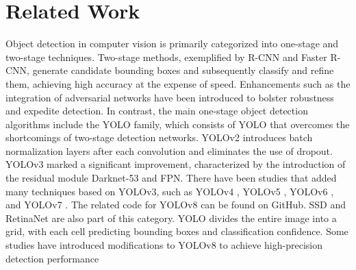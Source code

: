 \section{Related Work}
\label{sec2}


Object detection in computer vision is primarily categorized into one-stage and two-stage techniques. Two-stage methods, exemplified by R-CNN\cite{Rich Feature Hierarchies for Accurate Object Detection and Semantic Segmentation} and Faster R-CNN\cite{Faster R-CNN: Towards Real-Time Object Detection with Region Proposal Networks}, generate candidate bounding boxes and subsequently classify and refine them, achieving high accuracy at the expense of speed. Enhancements such as the integration of adversarial networks have been introduced to bolster robustness and expedite detection. In contrast, the main one-stage object detection algorithms include the YOLO family, which consists of YOLO \cite{redomnYOLO2016} that overcomes the shortcomings of two-stage detection networks. YOLOv2 \cite{YOLO9000} introduces batch normalization layers after each convolution and eliminates the use of dropout. YOLOv3 \cite{YOLOv3: An Incremental Improvement} marked a significant improvement, characterized by the introduction of the residual module Darknet-53 and FPN. There have been studies that added many techniques based on YOLOv3, such as YOLOv4 \cite{Yolov4: Optimal speed and accuracy of object detection}, YOLOv5 \cite{YOLOv5 by Ultralytics}, YOLOv6 \cite{YOLOv6: A Single-Stage Object Detection Framework for Industrial Applications 2022}, and YOLOv7 \cite{YOLOv7: Trainable Bag-of-Freebies Sets New State-of-the-Art for Real-Time Object Detectors}. The related code for YOLOv8 can be found on GitHub. SSD \cite{SSD: Single Shot MultiBox Detector} and RetinaNet \cite{Focal Loss for Dense Object Detection} are also part of this category. YOLO divides the entire image into a grid, with each cell predicting bounding boxes and classification confidence. Some studies have introduced modifications to YOLOv8 to achieve high-precision detection performance \cite{Underwater Object Detection Using TC-YOLO with Attention Mechanisms, Fish Detection under Occlusion Using Modified You Only Look Once v8 Integrating Real-Time Detection Transformer Features, Student Behavior Detection in the Classroom Based on Improved YOLOv8}

